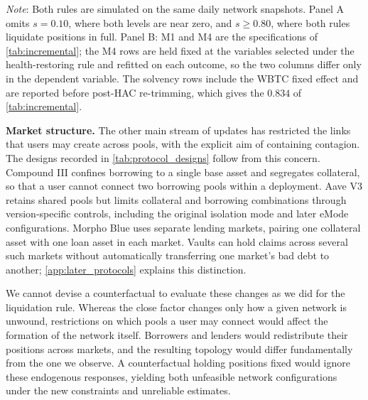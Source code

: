 \documentclass[a4paper,UKenglish,cleveref, autoref, thm-restate]{informs3}
\newcommand{\rev}[1]{{\color{purple}#1}}
\DeclareRobustCommand{\latestrev}[1]{{\color{red}\hypersetup{linkcolor=red,citecolor=red,urlcolor=red}#1}}
\newcommand{\boldpara}[1]{\noindent\textbf{#1}\quad}
\begin{document}
\begin{table}[ht]
\begin{threeparttable}
\begin{tablenotes}[flushleft]
\setlength{\itemsep}{0pt}
\setlength{\parsep}{0pt}
{\scriptsize
\item \rev{\textit{Note}: Both rules are simulated on the same daily
network snapshots. Panel A omits $s = 0.10$, where both levels are
near zero, and $s \geq 0.80$, where both rules liquidate positions in
full. Panel B: M1 and M4 are the specifications of
\autoref{tab:incremental}; the M4 rows are held fixed at the variables
selected under the health-restoring rule and refitted on each outcome, so the two columns differ only in the
dependent variable. The solvency rows include the WBTC fixed effect
and are reported before post-HAC re-trimming, which gives the $0.834$
of \autoref{tab:incremental}.}
}
\end{tablenotes}
\end{threeparttable}
\end{table}
\FloatBarrier

\medskip

\label{sec:market_structure}
\rev{\boldpara{Market structure.}
The other main stream of updates has restricted the links
that users may create across pools, with the explicit aim of
containing contagion. The
designs recorded in \autoref{tab:protocol_designs} follow from this
concern. Compound III confines borrowing to a single base asset and
segregates collateral, so that a user cannot connect two borrowing
pools within a deployment. Aave V3 retains shared pools but \latestrev{limits collateral and borrowing combinations through version-specific controls, including the original isolation mode and later eMode configurations}. Morpho \latestrev{Blue uses separate lending markets}, pairing one
collateral asset with one loan asset in each market. \latestrev{Vaults can hold claims across several such markets without automatically transferring one market's bad debt to another; \ref{app:later_protocols} explains this distinction.}}

\rev{We cannot devise a counterfactual to evaluate these changes as we did 
for the liquidation
rule. Whereas the close factor changes only how a given network is
unwound, restrictions on which pools a user may connect would affect
the formation of the network itself. Borrowers and lenders would redistribute
their positions across markets, and the resulting topology would
differ fundamentally from the one we observe. A counterfactual holding
positions fixed would ignore these endogenous responses, yielding both
unfeasible network configurations under the new constraints and
unreliable estimates.}
\end{document}
